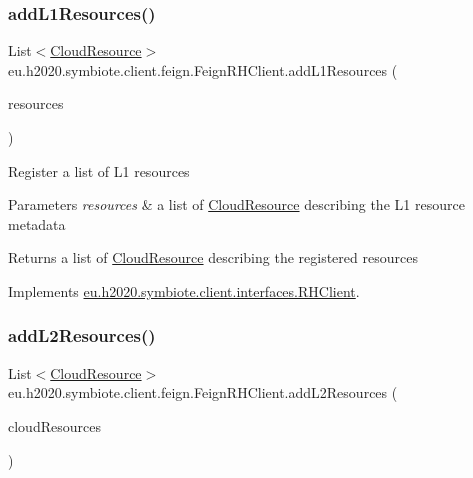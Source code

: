 \subsubsection{\texorpdfstring{add\+L1\+Resources()}{addL1Resources()}}
{\footnotesize\ttfamily List$<$\hyperlink{classeu_1_1h2020_1_1symbiote_1_1cloud_1_1model_1_1internal_1_1CloudResource}{Cloud\+Resource}$>$ eu.\+h2020.\+symbiote.\+client.\+feign.\+Feign\+R\+H\+Client.\+add\+L1\+Resources (\begin{DoxyParamCaption}\item[{List$<$ \hyperlink{classeu_1_1h2020_1_1symbiote_1_1cloud_1_1model_1_1internal_1_1CloudResource}{Cloud\+Resource} $>$}]{resources }\end{DoxyParamCaption})}

Register a list of L1 resources


\begin{DoxyParams}{Parameters}
{\em resources} & a list of \hyperlink{}{Cloud\+Resource} describing the L1 resource metadata \\
\hline
\end{DoxyParams}
\begin{DoxyReturn}{Returns}
a list of \hyperlink{}{Cloud\+Resource} describing the registered resources 
\end{DoxyReturn}


Implements \hyperlink{interfaceeu_1_1h2020_1_1symbiote_1_1client_1_1interfaces_1_1RHClient_a80cce815fd699a09524ed5aa40b9af0e}{eu.\+h2020.\+symbiote.\+client.\+interfaces.\+R\+H\+Client}.

\mbox{\label{classeu_1_1h2020_1_1symbiote_1_1client_1_1feign_1_1FeignRHClient_abec39dd163ece294b6c4288a81980e10}} 
\subsubsection{\texorpdfstring{add\+L2\+Resources()}{addL2Resources()}}
{\footnotesize\ttfamily List$<$\hyperlink{classeu_1_1h2020_1_1symbiote_1_1cloud_1_1model_1_1internal_1_1CloudResource}{Cloud\+Resource}$>$ eu.\+h2020.\+symbiote.\+client.\+feign.\+Feign\+R\+H\+Client.\+add\+L2\+Resources (\begin{DoxyParamCaption}\item[{List$<$ \hyperlink{classeu_1_1h2020_1_1symbiote_1_1cloud_1_1model_1_1internal_1_1CloudResource}{Cloud\+Resource} $>$}]{cloud\+Resources }\end{DoxyParamCaption})}

